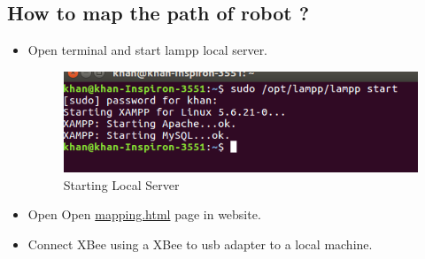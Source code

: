 \documentclass[11pt,a4paper]{article}
\begin{document}
	  \subsection{How to map the path of robot ?}
	 \begin{itemize}
	 \item Open terminal and start lampp local server.
	 
	 	\begin{figure}[h]
    \centering
	\includegraphics[scale=0.5]{lampstart.png}
	\caption{Starting Local Server}
	\end{figure}
	 
	 \item Open Open \href{https://github.com/eYSIP-2016/Wiced-Sense/blob/master/Codes/wiced_web/mapping.html}{mapping.html} page in website.
	 \item  Connect XBee using a XBee to usb adapter to a local machine.
	  

\end{itemize}
\end{document}
